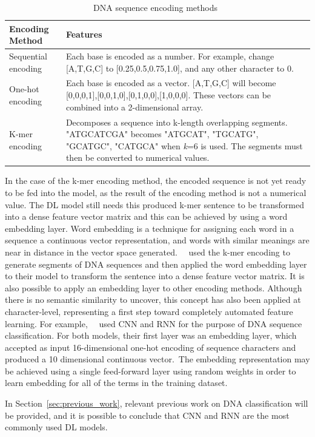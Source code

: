 \begin{table}[ht]
	\caption{DNA sequence encoding methods~\cite{Yang2020ReviewDNA}}
	\label{tab:encoding_methods}
\centering
\begin{tabular}{lp{8cm}}
	\toprule
	\textbf{Encoding Method} & \textbf{Features} \\
	\midrule
	
	Sequential encoding & Each base is encoded as a number. For example, change [A,T,G,C] to [0.25,0.5,0.75,1.0], and any other character to 0.\\\midrule
	
    One-hot encoding & Each base is encoded as a vector. [A,T,G,C] will become [0,0,0,1],[0,0,1,0],[0,1,0,0],[1,0,0,0]. These vectors can be combined into a 2-dimensional array.\\\midrule
    
    K-mer encoding & Decomposes a sequence into k-length overlapping segments. "ATGCATCGA" becomes "ATGCAT", "TGCATG", "GCATGC", "CATGCA"  when \textit{k}=6 is used. The segments must then be converted to numerical values.\\
    
	\bottomrule
\end{tabular}
\end{table}

In the case of the k-mer encoding method, the encoded sequence is not yet ready to be fed into the model, as the result of the encoding method is not a numerical value. The \gls{DL} model still needs this produced k-mer sentence to be transformed into a dense feature vector matrix and this can be achieved by using a word embedding layer. Word embedding is a technique for assigning each word in a sequence a continuous vector representation, and words with similar meanings are near in distance in the vector space generated.~\citeauthor{Gunasekaran2021AnalysisModels}~\cite{Gunasekaran2021AnalysisModels} used the k-mer encoding to generate segments of \gls{DNA} sequences and then applied the word embedding layer to their model to transform the sentence into a dense feature vector matrix. It is also possible to apply an embedding layer to other encoding methods. Although there is no semantic similarity to uncover, this concept has also been applied at character-level, representing a first step toward completely automated feature learning. For example,~\citeauthor{LoBosco2017DeepClassification}~\cite{LoBosco2017DeepClassification} used \gls{CNN} and \gls{RNN} for the purpose of \gls{DNA} sequence classification. For both models, their first layer was an embedding layer, which accepted as input 16-dimensional one-hot encoding of sequence characters and produced a 10 dimensional continuous vector. The embedding representation may be achieved using a single feed-forward layer using random weights in order to learn embedding for all of the terms in the training dataset.

In Section~\ref{sec:previous_work}, relevant previous work on DNA classification will be provided, and it is possible to conclude that \gls{CNN} and \gls{RNN} are the most commonly used \gls{DL} models.

